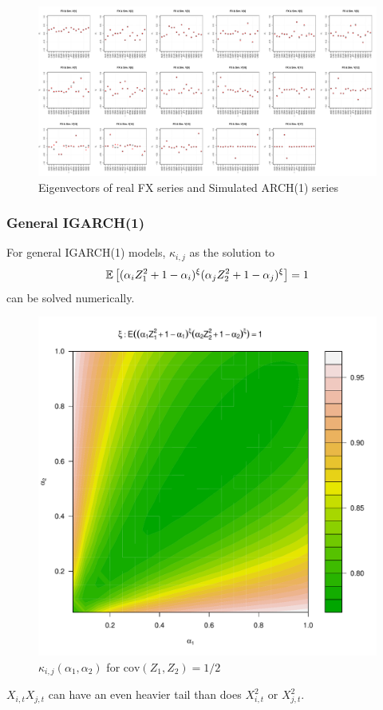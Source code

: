 \documentclass{beamer}
\begin{document}
\begin{frame}
  \begin{figure}[htb!]
    \centering
    \includegraphics[scale=0.2]{FX_ARCH_eigenvectors.pdf}
    \caption{\scriptsize Eigenvectors of real FX series and Simulated ARCH(1) series}
  \end{figure}
\end{frame}

\begin{frame}
  \frametitle{General IGARCH(1)}
  For general IGARCH(1) models, $\kappa_{i,j}$ as the solution to
  \begin{equation*}
    \mathbb{E} \left[
      (
      \alpha_i Z_1^2 + 1 - \alpha_i
      )^\xi
      (
      \alpha_j Z_2^2 + 1 - \alpha_j
      )^\xi\right] = 1
  \end{equation*}
  can be solved numerically.
  \begin{figure}
    \begin{center}
      \includegraphics[scale=0.2]{igarch_rho0dot5.pdf}      
    \end{center}
    \label{fig:xi_rho0.5}
    \caption{$\kappa_{i,j}(\alpha_1, \alpha_2)$ for $\text{cov}(Z_1, Z_2) = 1/2$}
  \end{figure}
  $X_{i,t} X_{j,t}$ can have an even heavier tail than does $X_{i,t}^2$ or $X_{j,t}^2$.
\end{frame}
\end{document}
